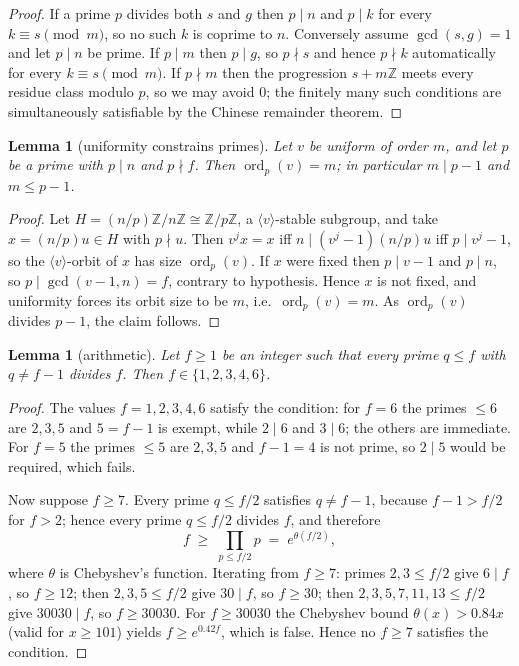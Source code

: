 \documentclass[11pt,a4paper]{article}
\theoremstyle{plain}
\newtheorem{lemma}[theorem]{Lemma}
\theoremstyle{definition}
\theoremstyle{remark}
\newcommand{\Z}{\mathbb{Z}}
\newcommand{\Zn}{\Z/n\Z}
\newcommand{\ord}{\operatorname{ord}}
\begin{document}
\begin{proof}
If a prime $p$ divides both $s$ and $g$ then $p\mid n$ and $p\mid k$ for every $k\equiv
s\pmod m$, so no such $k$ is coprime to $n$. Conversely assume $\gcd(s,g)=1$ and let $p\mid
n$ be prime. If $p\mid m$ then $p\mid g$, so $p\nmid s$ and hence $p\nmid k$ automatically
for every $k\equiv s\pmod m$. If $p\nmid m$ then the progression $s+m\Z$ meets every residue
class modulo $p$, so we may avoid $0$; the finitely many such conditions are simultaneously
satisfiable by the Chinese remainder theorem.
\end{proof}

\begin{lemma}[uniformity constrains primes]\label{lem:uniformprime}
Let $v$ be uniform of order $m$, and let $p$ be a prime with $p\mid n$ and $p\nmid f$. Then
$\ord_p(v)=m$; in particular $m\mid p-1$ and $m\le p-1$.
\end{lemma}

\begin{proof}
Let $H=(n/p)\Zn\cong\Z/p\Z$, a $\langle v\rangle$-stable subgroup, and take $x=(n/p)u\in H$
with $p\nmid u$. Then $v^{j}x=x$ iff $n\mid (v^{j}-1)(n/p)u$ iff $p\mid v^{j}-1$, so the
$\langle v\rangle$-orbit of $x$ has size $\ord_p(v)$. If $x$ were fixed then $p\mid v-1$ and
$p\mid n$, so $p\mid\gcd(v-1,n)=f$, contrary to hypothesis. Hence $x$ is not fixed, and
uniformity forces its orbit size to be $m$, i.e.\ $\ord_p(v)=m$. As $\ord_p(v)$ divides
$p-1$, the claim follows.
\end{proof}

\begin{lemma}[arithmetic]\label{lem:arith}
Let $f\ge1$ be an integer such that every prime $q\le f$ with $q\ne f-1$ divides $f$. Then
$f\in\{1,2,3,4,6\}$.
\end{lemma}

\begin{proof}
The values $f=1,2,3,4,6$ satisfy the condition: for $f=6$ the primes $\le6$ are $2,3,5$ and
$5=f-1$ is exempt, while $2\mid6$ and $3\mid6$; the others are immediate. For $f=5$ the
primes $\le5$ are $2,3,5$ and $f-1=4$ is not prime, so $2\mid5$ would be required, which
fails.

Now suppose $f\ge7$. Every prime $q\le f/2$ satisfies $q\ne f-1$, because $f-1>f/2$ for
$f>2$; hence every prime $q\le f/2$ divides $f$, and therefore
\[
  f\;\ge\;\prod_{p\le f/2}p\;=\;e^{\theta(f/2)},
\]
where $\theta$ is Chebyshev's function. Iterating from $f\ge7$: primes $2,3\le f/2$ give
$6\mid f$, so $f\ge12$; then $2,3,5\le f/2$ give $30\mid f$, so $f\ge30$; then
$2,3,5,7,11,13\le f/2$ give $30030\mid f$, so $f\ge30030$. For $f\ge30030$ the Chebyshev
bound $\theta(x)>0.84x$ (valid for $x\ge101$) yields $f\ge e^{0.42f}$, which is false. Hence
no $f\ge7$ satisfies the condition.
\end{proof}
\end{document}
